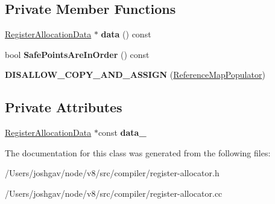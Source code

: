 \subsection*{Private Member Functions}
\begin{DoxyCompactItemize}
\item 
\hyperlink{classv8_1_1internal_1_1compiler_1_1_register_allocation_data}{Register\+Allocation\+Data} $\ast$ {\bfseries data} () const \hypertarget{classv8_1_1internal_1_1compiler_1_1_reference_map_populator_ae187546cb4bdbdce8f9533ee2e587a87}{}\label{classv8_1_1internal_1_1compiler_1_1_reference_map_populator_ae187546cb4bdbdce8f9533ee2e587a87}

\item 
bool {\bfseries Safe\+Points\+Are\+In\+Order} () const \hypertarget{classv8_1_1internal_1_1compiler_1_1_reference_map_populator_a059b0af95007c19e93da9dcf542efdd4}{}\label{classv8_1_1internal_1_1compiler_1_1_reference_map_populator_a059b0af95007c19e93da9dcf542efdd4}

\item 
{\bfseries D\+I\+S\+A\+L\+L\+O\+W\+\_\+\+C\+O\+P\+Y\+\_\+\+A\+N\+D\+\_\+\+A\+S\+S\+I\+GN} (\hyperlink{classv8_1_1internal_1_1compiler_1_1_reference_map_populator}{Reference\+Map\+Populator})\hypertarget{classv8_1_1internal_1_1compiler_1_1_reference_map_populator_ab76e2cbecdf648e5b96ad7451809c60b}{}\label{classv8_1_1internal_1_1compiler_1_1_reference_map_populator_ab76e2cbecdf648e5b96ad7451809c60b}

\end{DoxyCompactItemize}
\subsection*{Private Attributes}
\begin{DoxyCompactItemize}
\item 
\hyperlink{classv8_1_1internal_1_1compiler_1_1_register_allocation_data}{Register\+Allocation\+Data} $\ast$const {\bfseries data\+\_\+}\hypertarget{classv8_1_1internal_1_1compiler_1_1_reference_map_populator_adadfb70c540f8ef81765d8e9f8d786ad}{}\label{classv8_1_1internal_1_1compiler_1_1_reference_map_populator_adadfb70c540f8ef81765d8e9f8d786ad}

\end{DoxyCompactItemize}


The documentation for this class was generated from the following files\+:\begin{DoxyCompactItemize}
\item 
/\+Users/joshgav/node/v8/src/compiler/register-\/allocator.\+h\item 
/\+Users/joshgav/node/v8/src/compiler/register-\/allocator.\+cc\end{DoxyCompactItemize}
